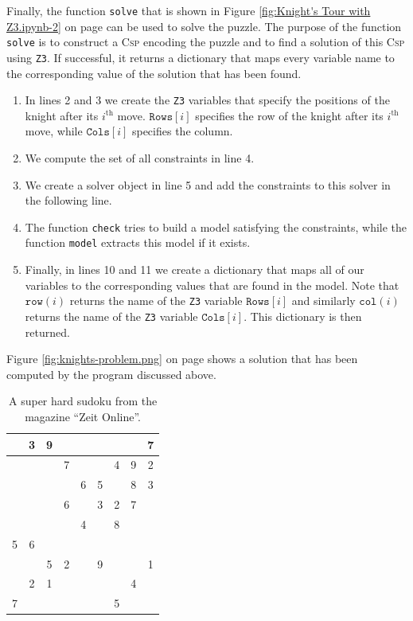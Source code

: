 Finally, the function \texttt{solve} that is shown in Figure \ref{fig:Knight's Tour with Z3.ipynb-2} on page
\pageref{fig:Knight's Tour with Z3.ipynb-2} can be used to solve the puzzle.
The purpose of the function \texttt{solve} is to construct a \textsc{Csp} encoding the puzzle and to find a
solution of this \textsc{Csp} using \texttt{Z3}.
If successful, it returns a dictionary that maps every variable name to the corresponding value of the solution
that has been found.
\begin{enumerate}
\item In lines 2 and 3 we create the \texttt{Z3} variables that specify the positions of the knight after its
      $i^{\mathrm{th}}$ move.  $\texttt{Rows}[i]$ specifies the row of the knight after its
      $i^{\mathrm{th}}$ move, while $\texttt{Cols}[i]$ specifies the column.
\item We compute the set of all constraints in line 4.   
\item We create a solver object in line 5 and add the constraints to this solver in the following line.
\item The function \texttt{check} tries to build a model satisfying the constraints, while the function
      \texttt{model} extracts this model if it exists.
\item Finally, in lines 10 and 11 we create a dictionary that maps all of our variables to the corresponding
      values that are found in the model.  Note that $\texttt{row}(i)$ returns the name of the
      \texttt{Z3} variable $\texttt{Rows}[i]$ and similarly $\mathtt{col}(i)$ returns the name of the
      \texttt{Z3} variable $\texttt{Cols}[i]$.
      This dictionary is then returned.
\end{enumerate}
Figure \ref{fig:knights-problem.png} on page \pageref{fig:knights-problem.png} shows a solution that has been
computed by the program discussed above.






\begin{table}[h]
  \centering
  \begin{tabular}{||c|c|c||c|c|c||c|c|c||}
    \hline
    \hline
      & 3 & 9 &   &   &   &   &   & 7 \\
    \hline
      &   &   & 7 &   &   & 4 & 9 & 2 \\
    \hline
      &   &   &   & 6 & 5 &   & 8 & 3 \\
    \hline
    \hline
      &   &   & 6 &   & 3 & 2 & 7 &   \\
    \hline
      &   &   &   & 4 &   & 8 &   &   \\
    \hline
    5 & 6 &   &   &   &   &   &   &   \\
    \hline
    \hline
      &   & 5 & 2 &   & 9 &   &   & 1 \\
    \hline
      & 2 & 1 &   &   &   &   & 4 &   \\
    \hline
    7 &   &   &   &   &   & 5 &   &   \\
    \hline
    \hline
  \end{tabular}
  \caption{A super hard sudoku from the magazine ``Zeit Online''.}
  \label{tab:sudoku}
\end{table}


